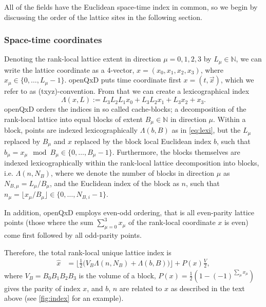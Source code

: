 All of the fields have the Euclidean space-time index in common, so we begin by discussing the order of the lattice sites in the following section.

\subsubsection{Space-time coordinates}

Denoting the rank-local lattice extent in direction $\mu=0,1,2,3$ by $L_\mu \in \mathbb{N}$, we can write the lattice coordinate as a 4-vector, $x = (x_0,x_1,x_2,x_3)$, where $x_\mu \in \{ 0, \dots, L_\mu -1 \}$. openQxD puts time coordinate first $x = (t, \vec{x})$, which we refer to as (txyz)-convention. From that we can create a lexicographical index
\begin{equation} \label{eq:lexi}
\Lambda(x, L) := L_3 L_2 L_1 x_0 + L_3 L_2 x_1 + L_3 x_2 + x_3.
\end{equation}
openQxD orders the indices in so called cache-blocks; a decomposition of the rank-local lattice into equal blocks of extent $B_\mu \in \mathbb{N}$ in direction $\mu$. Within a block, points are indexed lexicographically $\Lambda(b, B)$ as in \cref{eq:lexi}, but the $L_\mu$ replaced by $B_\mu$ and $x$ replaced by the block local Euclidean index $b$, such that $b_\mu = x_\mu \mod B_\mu \in \{ 0, \dots, B_\mu -1 \}$.  
Furthermore, the blocks themselves are indexed lexicographically within the rank-local lattice decomposition into blocks, i.e. $\Lambda(n, N_B)$, where we denote the number of blocks in direction $\mu$ as $N_{B,\mu} = L_\mu / B_\mu$, and the Euclidean index of the block as $n$, such that $n_\mu = \lfloor x_\mu / B_\mu \rfloor \in \{ 0, \dots, N_{B,i} -1 \}$.

In addition, openQxD employs even-odd ordering, that is all even-parity lattice points (those where the sum $\sum_{\mu=0}^3 x_\mu$ of the rank-local coordinate $x$ is even) come first followed by all odd-parity points.

Therefore, the total rank-local unique lattice index is
\begin{align} \label{eq:ipt}
\hat{x} &= \biggl \lfloor \frac{1}{2} \Big( V_B \Lambda(n, N_B) + \Lambda(b, B) \Big) \biggr \rfloor + P(x) \frac{V}{2},
\end{align}
where $V_B = B_0 B_1 B_2 B_3$ is the volume of a block, $P(x)=\tfrac{1}{2}(1-(-1)^{\sum_\mu x_\mu})$ gives the parity of index $x$, and $b$, $n$ are related to $x$ as described in the text above (see \cref{fig:index} for an example).

